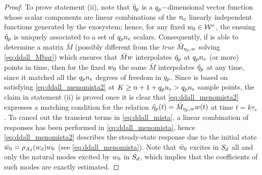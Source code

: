 \begin{proof}
  To prove statement (ii), note that $\tilde{\eta}_p$ is a ${q_p}-$dimensional vector function whose scalar components are linear combinations of the ${n_e}$ linearly independent functions generated by the exosystem; hence, for any fixed $w_0\in\mathcal{W}^\circ$, the ensuing $\tilde{\eta}_p$ is uniquely associated to a set of ${q_p} {n_e}$ scalars. Consequently, if  is able to determine a matrix $\bar{M}$ (possibly different from the \emph{true} $\bar{M}_{\eta_p,w}$ solving \eqref{eq:ddall_Mbar}) which ensures that $\bar{M}w$ interpolates $\tilde{\eta}_p$ at ${q_p} {n_e}$ (or more) points in time, then for the fixed $w_0$ the same $\bar{M}$ interpolates $\tilde{\eta}_p$ at any time, since it matched all the ${q_p} {n_e}$ degrees of freedom in ${q_p}$. Since  is based on satisfying \eqref{eq:ddall_menomista2} at $K\geq n+1+{q_p} {n_e}>{q_p} {n_e}$ sample points, the claim in statement (ii) is proved once it is clear that \eqref{eq:ddall_menomista2} expresses a matching condition for the relation $\tilde{\eta}_p(t)=\bar{M}_{\eta_p,w}w(t)$ at time $t=k\tau_s$. To cancel out the transient terms in \eqref{eq:ddall_mista}, a linear combination of responses has been performed in \eqref{eq:ddall_menomista}, hence \eqref{eq:ddall_menomista2} describes the steady-state response due to the initial state $\bar{w}_0=\rho_{A_d}(w_d)w_0$ (see \eqref{eq:ddall_menomista}). Note that $\bar{w}_0$ excites in $S_d$ all and only the natural modes excited by $w_0$ in $S_d$, which implies that the coefficients of such modes are exactly estimated.


\end{proof}
